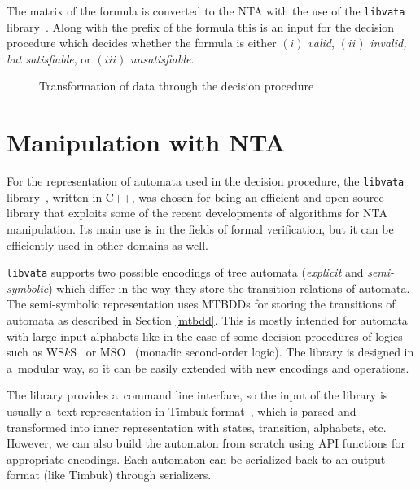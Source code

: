The matrix of the formula is converted to the NTA
with the use of the \texttt{libvata} library~\cite{vata-tool}.
Along with the prefix of the formula this is an input for the decision procedure
which decides whether the formula is either $(i)$ \emph{valid}, $(ii)$
\emph{invalid, but satisfiable}, or $(iii)$ \emph{unsatisfiable}.

\begin{figure}[hb]
\begin{center}
 \caption{Transformation of data through the decision procedure}\label{flow}
 \end{center}
\end{figure}

\section{Manipulation with NTA}

For the representation of automata used in the decision procedure, the
\texttt{libvata} library~\cite{vata-tool}, written in C++, was chosen for being
an efficient and open source library that exploits some of the recent
developments of algorithms for NTA manipulation. Its main use is in the fields
of formal verification, but it can be efficiently used in other domains as well.

\texttt{libvata} supports two possible encodings of tree automata
(\emph{explicit} and \emph{semi-symbolic}) which differ in the way they store
the transition relations of automata. The semi-symbolic representation uses
MTBDDs for storing the transitions of automata as described in Section
\ref{mtbdd}. This is mostly intended for automata with large input alphabets
like in the case of some decision procedures of logics such as
WS$k$S~\cite{mona} or MSO~\cite{mso} (monadic second-order logic). The library
is designed in a~modular way, so it can be easily extended with new encodings
and operations.

The library provides a~command line interface, so the input of the library is
usually a~text representation in Timbuk format~\cite{timbuk}, which
is parsed and transformed into inner representation with states, transition,
alphabets, etc. However, we can also build the automaton from scratch using API
functions for appropriate encodings. Each automaton can be serialized back to an
output format (like Timbuk) through serializers.

